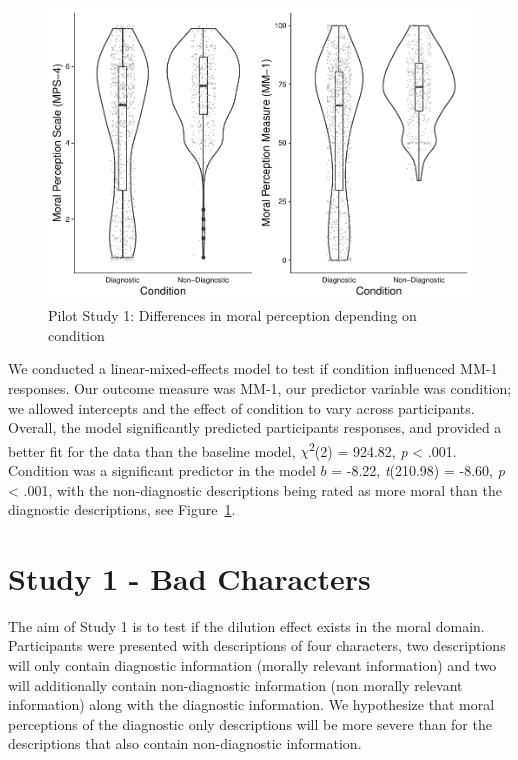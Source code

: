 \documentclass[
  english,
  man,floatsintext]{apa7}
\begin{document}
\begin{figure}
\centering
\includegraphics{moral_dilution_in_chunks_files/figure-latex/pilot1bothconditionplot-1.pdf}
\caption{\label{fig:pilot1bothconditionplot}Pilot Study 1: Differences in moral perception depending on condition}
\end{figure}

We conducted a linear-mixed-effects model to test if condition influenced MM-1 responses. Our outcome measure was MM-1, our predictor variable was condition; we allowed intercepts and the effect of condition to vary across participants. Overall, the model significantly predicted participants responses, and provided a better fit for the data than the baseline model, \(\chi\)\textsuperscript{2}(2) = 924.82, \emph{p} \textless{} .001. Condition was a significant predictor in the model \(b\) = -8.22, \emph{t}(210.98) = -8.60, \emph{p} \textless{} .001, with the non-diagnostic descriptions being rated as more moral than the diagnostic descriptions, see Figure~\ref{fig:pilot1bothconditionplot}.

\hypertarget{study-1---bad-characters}{%
\section{Study 1 - Bad Characters}\label{study-1---bad-characters}}

The aim of Study 1 is to test if the dilution effect exists in the moral domain. Participants were presented with descriptions of four characters, two descriptions will only contain diagnostic information (morally relevant information) and two will additionally contain non-diagnostic information (non morally relevant information) along with the diagnostic information. We hypothesize that moral perceptions of the diagnostic only descriptions will be more severe than for the descriptions that also contain non-diagnostic information.
\end{document}

